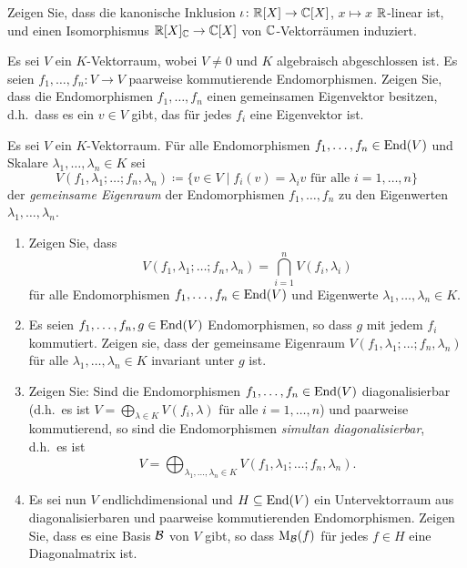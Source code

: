 \documentclass[a4paper,10pt]{scrartcl}
\begin{document}
\begin{question}
  Zeigen Sie, dass die kanonische Inklusion $\iota \colon \mathbb{R}[X] \to \mathbb{C}[X]$, $x \mapsto x$ $\mathbb{R}$-linear ist, und einen Isomorphismus $\mathbb{R}[X]_{\mathbb{C}} \to \mathbb{C}[X]$ von $\mathbb{C}$-Vektorräumen induziert.
\end{question}













\begin{question}
  Es sei $V$ ein $K$-Vektorraum, wobei $V \neq 0$ und $K$ algebraisch abgeschlossen ist.
  Es seien $f_1, \dotsc, f_n \colon V \to V$ paarweise kommutierende Endomorphismen.
  Zeigen Sie, dass die Endomorphismen $f_1, \dotsc, f_n$ einen gemeinsamen Eigenvektor besitzen, d.h.\ dass es ein $v \in V$ gibt, das für jedes $f_i$ eine Eigenvektor ist.
\end{question}


\begin{question}
  Es sei $V$ ein $K$-Vektorraum.
  Für alle Endomorphismen $f_1, \dotsc, f_n \in \operatorname{End}(V)$ und Skalare $\lambda_1, \dotsc, \lambda_n \in K$ sei
  \[
              V(f_1, \lambda_1; \dotsc; f_n, \lambda_n)
    \coloneqq \{ v \in V \mid \text{$f_i(v) = \lambda_i v$ für alle $i = 1, \dotsc, n$} \}
  \]
  der \emph{gemeinsame Eigenraum} der Endomorphismen $f_1, \dotsc, f_n$ zu den Eigenwerten $\lambda_1, \dotsc, \lambda_n$.
  \begin{enumerate}[leftmargin=*]
    \item
      Zeigen Sie, dass
      \[
          V(f_1, \lambda_1; \dotsc; f_n, \lambda_n)
        = \bigcap_{i=1}^n V(f_i, \lambda_i)
      \]
      für alle Endomorphismen $f_1, \dotsc, f_n \in \operatorname{End}(V)$ und Eigenwerte $\lambda_1, \dotsc, \lambda_n \in K$.
    \item
      Es seien $f_1, \dotsc, f_n, g \in \operatorname{End}(V)$ Endomorphismen, so dass $g$ mit jedem $f_i$ kommutiert.
      Zeigen sie, dass der gemeinsame Eigenraum $V(f_1, \lambda_1; \dots; f_n, \lambda_n)$ für alle $\lambda_1, \dotsc, \lambda_n \in K$ invariant unter $g$ ist.
    \item
      Zeigen Sie: Sind die Endomorphismen $f_1, \dotsc, f_n \in \operatorname{End}(V)$ diagonalisierbar (d.h.\ es ist $V = \bigoplus_{\lambda \in K} V(f_i, \lambda)$ für alle $i = 1, \dotsc, n$) und paarweise kommutierend, so sind die Endomorphismen \emph{simultan diagonalisierbar}, d.h.\ es ist
      \[
          V
        = \bigoplus_{\lambda_1, \dotsc, \lambda_n \in K}  V(f_1, \lambda_1; \dotsc; f_n, \lambda_n).
      \]
    \item
      Es sei nun $V$ endlichdimensional und $H \subseteq \operatorname{End}(V)$ ein Untervektorraum aus diagonalisierbaren und paarweise kommutierenden Endomorphismen.
      Zeigen Sie, dass es eine Basis $\mathcal{B}$ von $V$ gibt, so dass $\operatorname{M}_{\mathcal{B}}(f)$ für jedes $f \in H$ eine Diagonalmatrix ist.
  \end{enumerate}
\end{question}
\end{document}
